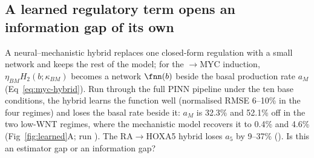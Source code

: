 \subsection{A learned regulatory term opens an information gap of its own}
\label{sec:res-hybrid}

A neural--mechanistic hybrid replaces one closed-form regulation with a small
network and keeps the rest of the model; for the \bcat{}$\to$MYC induction,
$\eta_{BM}H_2(b;\kappa_{BM})$ becomes a network $\fnn(b)$ beside the basal
production rate $a_M$ (Eq~\eqref{eq:myc-hybrid}). Run through the full PINN
pipeline under the ten base conditions, the hybrid learns the function well
(normalised RMSE 6--10\% in the four regimes) and loses the basal rate beside
it: $a_M$ is 32.3\% and 52.1\% off in the two low-WNT regimes, where the
mechanistic model recovers it to 0.4\% and 4.6\% (Fig~\ref{fig:learned}A;
run ). The RA$\to$HOXA5 hybrid loses $a_5$ by
9--37\% (). Is this an estimator gap or an
information gap?

